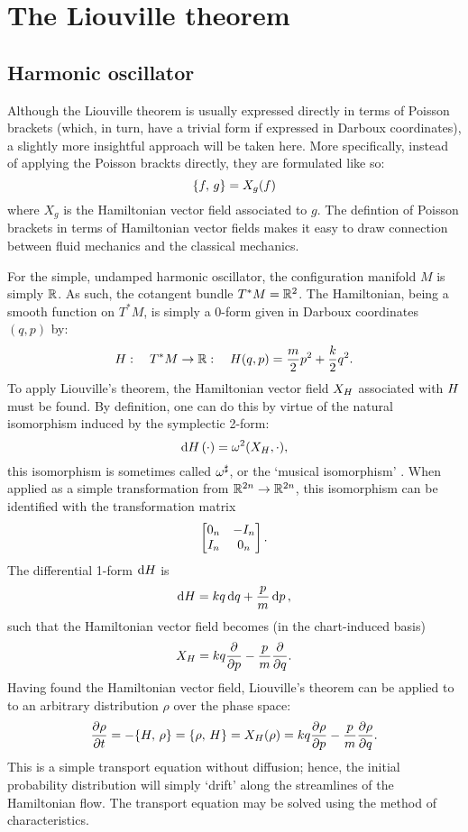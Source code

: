 \chapter{The Liouville theorem}

\section{Harmonic oscillator}
Although the Liouville theorem is usually expressed directly in terms of Poisson brackets (which, in turn, have a trivial form if expressed in Darboux coordinates), a slightly more insightful approach will be taken here. More specifically, instead of applying the Poisson brackts directly, they are formulated like so:
$$ \qty{f,\,g} = X_g(f) $$
where $X_g$ is the Hamiltonian vector field associated to $g$. The defintion of Poisson brackets in terms of Hamiltonian vector fields makes it easy to draw connection between fluid mechanics and the classical mechanics.

For the simple, undamped harmonic oscillator, the configuration manifold $M$ is simply $\mathbb{R}$. As such, the cotangent bundle $T^*M = \mathbb{R}^2$. The Hamiltonian, being a smooth function on $T^*M$, is simply a 0-form given in Darboux coordinates $(q, p)$ by:
\begin{equation}
    H:\quad T^*M \to \mathbb{R}:\quad H(q, p) = \frac{m}{2}p^2 + \frac{k}{2}q^2.
\end{equation}
To apply Liouville's theorem, the Hamiltonian vector field $X_{H}$ associated with $H$ must be found. By definition, one can do this by virtue of the natural isomorphism induced by the symplectic 2-form:
$$ \dd{\ensuremath{H}}(\cdot) = \omega^2(X_{H}, \cdot), $$
this isomorphism is sometimes called $\omega^\sharp$, or the `musical isomorphism' \cite{Abraham1978}. When applied as a simple transformation from $\mathbb{R}^{2n} \to \mathbb{R}^{2n}$, this isomorphism can be identified with the transformation matrix \cite{Arnold1989}
$$ \bmqty{0_n & -I_n \\ I_n & 0_n}. $$
The differential 1-form $\dd{\ensuremath{H}}$ is
$$ \dd{\ensuremath{H}} = kq\dd{q} + \frac{p}{m}\dd{p}, $$ 
such that the Hamiltonian vector field becomes (in the chart-induced basis)
$$ X_{H} = kq\pdv{}{p} - \frac{p}{m}\pdv{}{q}. $$
Having found the Hamiltonian vector field, Liouville's theorem can be applied to to an arbitrary distribution $\rho$ over the phase space:
\begin{equation}
    \pdv{\rho}{t} = -\qty{H,\,\rho} = \qty{\rho,\,H} = X_H(\rho) = kq\pdv{\rho}{p} - \frac{p}{m}\pdv{\rho}{q}.
    \label{eq:pde_ho}
\end{equation}
This is a simple transport equation without diffusion; hence, the initial probability distribution will simply `drift' along the streamlines of the Hamiltonian flow. The transport equation may be solved using the method of characteristics.


